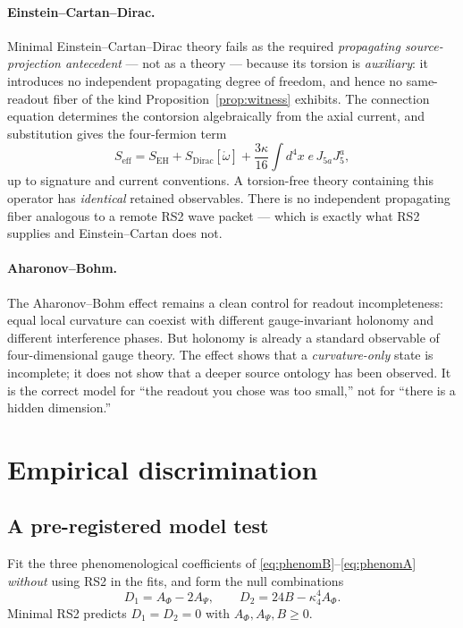 \documentclass[11pt,a4paper]{article}
\theoremstyle{plain}
\theoremstyle{definition}
\newcommand{\kfour}{\kappa_4}
\begin{document}
\paragraph{Einstein--Cartan--Dirac.}
Minimal Einstein--Cartan--Dirac theory fails as the required
\emph{propagating source-projection antecedent} --- not as a theory ---
because its torsion is \emph{auxiliary}: it introduces no independent
propagating degree of freedom, and hence no same-readout fiber of the
kind Proposition~\ref{prop:witness} exhibits. The connection equation
determines the contorsion algebraically from the axial current, and
substitution gives the four-fermion term \cite{Diakonov}
\begin{equation}
\label{eq:ECD}
S_{\mathrm{eff}}
=S_{\mathrm{EH}}+S_{\mathrm{Dirac}}[\mathring\omega]
+\frac{3\kappa}{16}\int d^4x\;e\,J_{5a}J_5^a,
\end{equation}
up to signature and current conventions. A torsion-free theory containing
this operator has \emph{identical} retained observables. There is no
independent propagating fiber analogous to a remote RS2 wave packet ---
which is exactly what RS2 supplies and Einstein--Cartan does not.

\paragraph{Aharonov--Bohm.}
The Aharonov--Bohm effect \cite{AharonovBohm} remains a clean control for
readout incompleteness: equal local curvature can coexist with different
gauge-invariant holonomy and different interference phases. But holonomy
is already a standard observable of four-dimensional gauge theory. The
effect shows that a \emph{curvature-only} state is incomplete; it does
not show that a deeper source ontology has been observed. It is the
correct model for ``the readout you chose was too small,'' not for
``there is a hidden dimension.''

\section{Empirical discrimination}
\label{sec:empirical}

\subsection{A pre-registered model test}

Fit the three phenomenological coefficients of
\eqref{eq:phenomB}--\eqref{eq:phenomA} \emph{without} using RS2 in the
fits, and form the null combinations
\begin{equation}
\label{eq:nulls}
\boxed{\;
D_1=A_\Phi-2A_\Psi,
\qquad
D_2=24B-\kfour^4A_\Phi .
\;}
\end{equation}
Minimal RS2 predicts $D_1=D_2=0$ with $A_\Phi,A_\Psi,B\ge0$.
\end{document}
